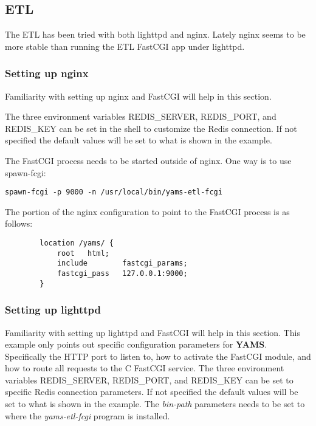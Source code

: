 \documentclass[a4paper,twoside,12pt]{article}
\begin{document}
\subsection{ETL}

The ETL has been tried with both lighttpd and nginx.  Lately nginx seems to be
more stable than running the ETL FastCGI app under lighttpd.

\subsubsection{Setting up nginx}

Familiarity with setting up nginx and FastCGI will help in this section.

The three environment variables REDIS\_SERVER, REDIS\_PORT, and REDIS\_KEY can
be set in the shell to customize the Redis connection.  If not specified the
default values will be set to what is shown in the example.

The FastCGI process needs to be started outside of nginx.  One way is to use
spawn-fcgi:
\lstset{language=sh}
\begin{lstlisting}
spawn-fcgi -p 9000 -n /usr/local/bin/yams-etl-fcgi
\end{lstlisting}

The portion of the nginx configuration to point to the FastCGI process is as
follows:
\lstset{language=clean}
\begin{lstlisting}
        location /yams/ {
            root   html;
            include        fastcgi_params;
            fastcgi_pass   127.0.0.1:9000;
        }
\end{lstlisting}

\subsubsection{Setting up lighttpd}

Familiarity with setting up lighttpd and FastCGI will help in this section.
This example only points out specific configuration parameters for
\textbf{YAMS}.  Specifically the HTTP port to listen to, how to activate the
FastCGI module, and how to route all requests to the C FastCGI service.  The
three environment variables REDIS\_SERVER, REDIS\_PORT, and REDIS\_KEY can be
set to specific Redis connection parameters.  If not specified the default
values will be set to what is shown in the example.  The \textit{bin-path}
parameters needs to be set to where the \textit{yams-etl-fcgi} program is
installed.
\end{document}
